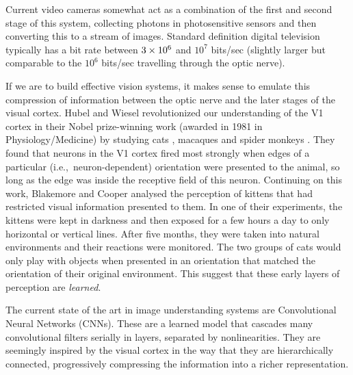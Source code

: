 Current video cameras somewhat act as a combination of the first and second
stage of this system, collecting photons in photosensitive sensors and then
converting this to a stream of images. Standard definition digital television
typically has
a bit rate between $3\times 10^6$ and $10^7$ bits/sec (slightly larger but comparable
to the $10^6$ bits/sec travelling through the optic nerve).

If we are to build effective vision systems, it makes sense to emulate this
compression of information between the optic nerve and the later stages of the visual
cortex. 
Hubel and Wiesel revolutionized our understanding of the V1 cortex in their Nobel prize-winning work
(awarded in 1981 in Physiology/Medicine) by
studying cats \cite{hubel_receptive_1959, hubel_receptive_1962}, macaques and spider
monkeys \cite{hubel_receptive_1968}. They found that neurons in the V1 cortex fired
most strongly when edges of a particular (i.e.,\ neuron-dependent) orientation
were presented to the animal, so long as the edge was inside the receptive field of
this neuron.
Continuing on this work, Blakemore and Cooper \cite{blakemore_development_1970}
analysed the perception of kittens that had restricted visual information
presented to them.
In one of their experiments, the kittens were kept in darkness
and then exposed for a few hours a day to only horizontal or vertical lines.
After five months, they were taken into natural environments and their reactions
were monitored. The two groups of cats would only play with objects when
presented in an orientation that matched the orientation of their original
environment. This suggest that these early layers of perception are
\emph{learned}.

The current state of the art in image understanding systems are
Convolutional Neural Networks (CNNs). These are a learned model that
cascades many convolutional filters serially in layers, separated by
nonlinearities.
They are seemingly inspired by the visual cortex in the way that they are
hierarchically connected, progressively compressing the information into a
richer representation.

